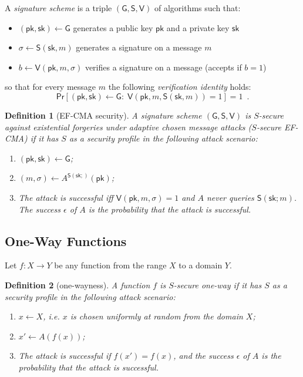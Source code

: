 \documentclass{article}
\newtheorem{definition}{Definition}[section]
\newcommand{\keygen}[0]{\mathsf{G}}
\newcommand{\sig}[0]{\mathsf{S}}
\newcommand{\sigver}[0]{\mathsf{V}}
\newcommand{\pubkey}[0]{\mathsf{pk}}
\newcommand{\prikey}[0]{\mathsf{sk}}
\begin{document}
A \emph{signature scheme} is a triple $(\keygen, \sig, \sigver)$ of algorithms such that:
\begin{itemize}
\item $(\pubkey, \prikey) \gets \keygen$ generates a public key $\pubkey$ and a private key $\prikey$
\item $\sigma \gets \sig(\prikey, m)$ generates a signature on a message $m$
\item $b \gets \sigver (\pubkey, m, \sigma)$ verifies a signature on a message (accepts if $b = 1$)
\end{itemize}
so that for every message $m$ the following \emph{verification identity} holds:
\[
\mathsf{Pr}[(\pubkey, \prikey) \gets \keygen \colon\; \sigver(\pubkey, m, \sig(\prikey, m)) = 1] = 1 \enspace.
\]

\begin{definition}[EF-CMA security]
A signature scheme $(\keygen, \sig, \sigver)$ is $S$-secure against existential forgeries under adaptive chosen message attacks ($S$-secure EF-CMA) if it has $S$ as a security profile in the following attack scenario:
\begin{enumerate}
\item $(\pubkey, \prikey) \gets \keygen$;
\item $(m,\sigma)\gets A^{\mathsf{S}(\prikey;)}(\pubkey)$;
\item The attack is successful iff $\mathsf{V}(\pubkey, m, \sigma)=1$
and $A$ never queries $\mathsf{S}(\prikey;m)$.
The success $\epsilon$ of $A$ is the probability that the attack is successful.
\end{enumerate}
\end{definition}

\subsection{One-Way Functions}

Let $f\colon X \rightarrow Y$ be any function from the range $X$ to a domain $Y$.

\begin{definition}[one-wayness]
A function $f$ is $S$-secure one-way if it has $S$ as a security profile in the following attack scenario:
\begin{enumerate}
\item $x\gets X$, i.e. $x$ is chosen uniformly at random from the domain $X$;
\item $x'\gets A(f(x))$;
\item The attack is successful if $f(x')=f(x)$,
and the success $\epsilon$ of $A$ is the probability that the attack is successful.
\end{enumerate}
\end{definition}
\end{document}
